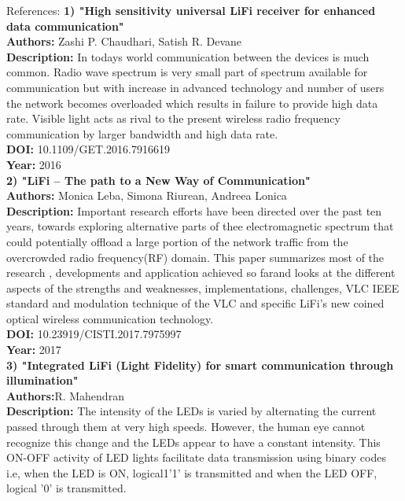 \documentclass[12pt]{report}	%
\begin{document}
{{{{{{{{{{\small
References: 
\newline \textbf{ 1) "High sensitivity universal LiFi receiver for enhanced data communication"}\\
\textbf{Authors:} Zashi P. Chaudhari, Satish R. Devane\\
\textbf{Description: }In todays world communication between the devices is much common. Radio wave spectrum is very small part of spectrum available for communication but with increase in advanced technology and number of users the network becomes overloaded which results in failure to provide high data rate. Visible light acts as rival to the present wireless radio frequency communication by larger bandwidth and high data rate.\\
\textbf{DOI: }10.1109/GET.2016.7916619\\
\textbf{Year: }2016\\
\newline \textbf{ 2) "LiFi – The path to a New Way of Communication"}\\
\textbf{Authors:} Monica Leba, Simona Riurean, Andreea Lonica\\
\textbf{Description: }Important research efforts have been directed over the past ten years, towards exploring alternative parts of thee electromagnetic spectrum that could potentially offload a large portion of the network traffic from the overcrowded radio frequency(RF) domain. This paper summarizes most of the research , developments and application achieved so farand looks at the different aspects of the strengths and weaknesses, implementations, challenges, VLC IEEE standard and modulation technique of the VLC and specific LiFi's new coined optical wireless communication technology.\\
\textbf{DOI: }10.23919/CISTI.2017.7975997\\
\textbf{Year: }2017\\
\newline \textbf{3)  "Integrated LiFi (Light Fidelity) for smart communication through illumination"}\\
\textbf{Authors:}R. Mahendran\\
\textbf{Description: }The intensity of the LEDs is varied by  alternating the current passed through them at very high speeds. However, the human eye cannot recognize this change and the LEDs appear to have a constant intensity. This ON-OFF activity of LED lights facilitate data transmission using binary codes i.e, when the LED is ON, logical1'1' is transmitted and when the LED OFF, logical '0' is transmitted.\\ 
}}}}}}}}}}
\end{document}
